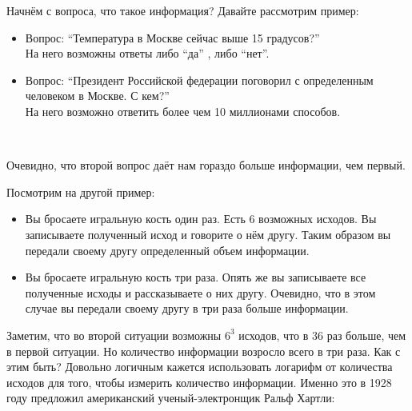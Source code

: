 





Начнём с вопроса, что такое информация? Давайте рассмотрим пример: \\

\begin{itemize}
  \item Вопрос: ``Температура в Москве сейчас выше 15 градусов?'' \\
           На него возможны ответы либо ``да'' , либо ``нет''.
  \item Вопрос: ``Президент Российской федерации поговорил с определенным человеком в Москве. С кем?'' \\
  	   На него возможно ответить более чем 10 миллионами способов.
\end{itemize}
\

Очевидно, что второй вопрос даёт нам гораздо больше информации, чем первый.


Посмотрим на другой пример: \\

\begin{itemize}
  \item Вы бросаете игральную кость один раз. Есть 6 возможных исходов. Вы записываете полученный исход и говорите о нём другу. Таким образом вы передали своему другу определенный объем информации.
  \item Вы бросаете игральную кость три раза. Опять же вы записываете все полученные исходы и рассказываете о них другу. Очевидно, что в этом случае вы передали своему другу в три раза больше информации.
\end{itemize}


Заметим, что во второй ситуации возможны $6^3$ исходов, что в 36 раз больше, чем в первой ситуации. Но количество информации возросло всего в три раза. Как с этим быть? Довольно логичным кажется использовать логарифм от количества исходов для того, чтобы измерить количество информации. Именно это в 1928 году предложил американский ученый-электронщик Ральф Хартли: \\


